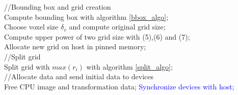 \documentclass[12pt,journal,compsoc]{IEEEtran}
\begin{document}
\begin{algorithm}

\textcolor{OliveGreen}{//Bounding box and grid creation}\\
Compute bounding box with algorithm \ref{bbox_algo};\\
Choose voxel size $\delta_v$ and compute original grid size;\\
Compute upper power of two grid size with (5),(6) and (7);\\
Allocate new grid on host in pinned memory;\\

\textcolor{OliveGreen}{//Split grid}\\
Split grid with $max(r_i)$ with algorithm \ref{split_algo};\\

\textcolor{OliveGreen}{//Allocate data and send initial data to devices}\\
Free CPU image and transformation data;
\textcolor{Blue}{Synchronize devices with host;}

\end{algorithm}
\end{document}

